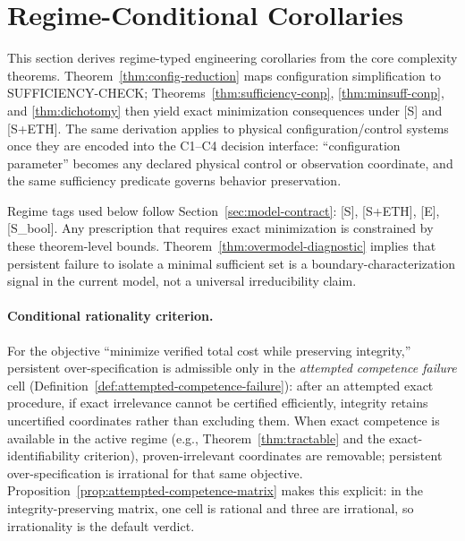 \section{Regime-Conditional Corollaries}\label{sec:engineering-justification}

This section derives regime-typed engineering corollaries from the core complexity theorems. Theorem~\ref{thm:config-reduction} maps configuration simplification to SUFFICIENCY-CHECK; Theorems~\ref{thm:sufficiency-conp}, \ref{thm:minsuff-conp}, and \ref{thm:dichotomy} then yield exact minimization consequences under [S] and [S+ETH].
The same derivation applies to physical configuration/control systems once they are encoded into the C1--C4 decision interface: ``configuration parameter'' becomes any declared physical control or observation coordinate, and the same sufficiency predicate governs behavior preservation.

Regime tags used below follow Section~\ref{sec:model-contract}: [S], [S+ETH], [E], [S\_bool].
Any prescription that requires exact minimization is constrained by these theorem-level bounds.
Theorem~\ref{thm:overmodel-diagnostic} implies that persistent failure to isolate a minimal sufficient set is a boundary-characterization signal in the current model, not a universal irreducibility claim.

\paragraph{Conditional rationality criterion.}
For the objective ``minimize verified total cost while preserving integrity,'' persistent over-specification is admissible only in the \emph{attempted competence failure} cell (Definition~\ref{def:attempted-competence-failure}): after an attempted exact procedure, if exact irrelevance cannot be certified efficiently, integrity retains uncertified coordinates rather than excluding them.
When exact competence is available in the active regime (e.g., Theorem~\ref{thm:tractable} and the exact-identifiability criterion), proven-irrelevant coordinates are removable; persistent over-specification is irrational for that same objective.
Proposition~\ref{prop:attempted-competence-matrix} makes this explicit: in the integrity-preserving matrix, one cell is rational and three are irrational, so irrationality is the default verdict.

